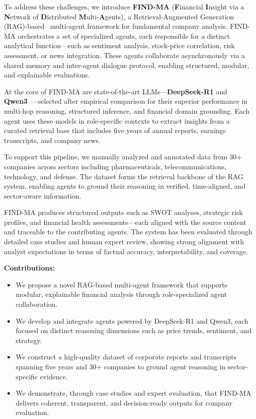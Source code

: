 \documentclass[11pt]{article}
\newcommand{\findma}{\textsc{FIND-MA}}
\begin{document}
To address these challenges, we introduce \textbf{\findma{}} (\textbf{F}inancial \textbf{I}nsight via a \textbf{N}etwork of \textbf{D}istributed \textbf{M}ulti-\textbf{A}gents), a Retrieval-Augmented Generation (RAG)-based~\citep{lewis2020retrieval} multi-agent framework for fundamental company analysis. \findma{} orchestrates a set of specialized agents, each responsible for a distinct analytical function—such as sentiment analysis, stock-price correlation, risk assessment, or news integration. These agents collaborate asynchronously via a shared memory and inter-agent dialogue protocol, enabling structured, modular, and explainable evaluations.

At the core of \findma{} are state-of-the-art LLMs—\textbf{DeepSeek-R1} and \textbf{Qwen3}~\citep{yang2024qwen2}—selected after empirical comparison for their superior performance in multi-hop reasoning, structured inference, and financial domain grounding. Each agent uses these models in role-specific contexts to extract insights from a curated retrieval base that includes five years of annual reports, earnings transcripts, and company news.

To support this pipeline, we manually analyzed and annotated data from 30+ companies across sectors including pharmaceuticals, telecommunications, technology, and defense. The dataset forms the retrieval backbone of the RAG system, enabling agents to ground their reasoning in verified, time-aligned, and sector-aware information.

\findma{} produces structured outputs such as SWOT analyses, strategic risk profiles, and financial health assessments—each aligned with the source content and traceable to the contributing agents. The system has been evaluated through detailed case studies and human expert review, showing strong alignment with analyst expectations in terms of factual accuracy, interpretability, and coverage.

\textbf{Contributions:}
\begin{itemize}
    \item We propose a novel RAG-based multi-agent framework that supports modular, explainable financial analysis through role-specialized agent collaboration.
    \item We develop and integrate agents powered by DeepSeek-R1 and Qwen3, each focused on distinct reasoning dimensions such as price trends, sentiment, and strategy.
    \item We construct a high-quality dataset of corporate reports and transcripts spanning five years and 30+ companies to ground agent reasoning in sector-specific evidence.
    \item We demonstrate, through case studies and expert evaluation, that \findma{} delivers coherent, transparent, and decision-ready outputs for company evaluation.
\end{itemize}
\end{document}
